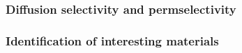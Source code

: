 \documentclass[main]{subfiles}
\begin{document}
\subsubsection{Diffusion selectivity and permselectivity}


\subsubsection{Identification of interesting materials}


\end{document}
